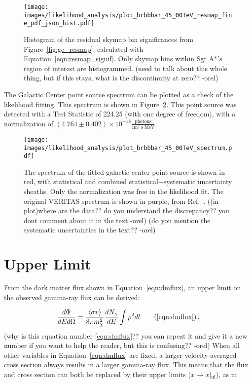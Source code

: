   \begin{figure}[ht]
    \centering
    \texttt{[image: images/likelihood\_analysis/plot\_brbbbar\_45\_00TeV\_resmap\_fine\_pdf\_json\_hist.pdf]}
    \caption[Galactic Center Residual Histogram]
    {
      Histogram of the residual skymap bin significances from Figure~\ref{fig:gc_resmap}, calculated with Equation~\ref{eqn:resmap_signif}.
      Only skymap bins within Sgr A*'s region of interest are histogrammed.
      {\color{red}(need to talk about this whole thing, but if this stays, what is the discontinuity at zero?? -orel)}
    }
    \label{fig:gc_resmap_sighist}
  \end{figure}


  The Galactic Center point source spectrum can be plotted as a check of the likelihood fitting.
  This spectrum is shown in Figure~\ref{fig:gc_pntsrc_spectrum}.
  This point source was detected with a Test Statistic of 224.25 (with one degree of freedom), with a normalization of $(4.764\pm0.402)\times 10^{-18} \frac{\textrm{photons}}{\textrm{cm}^2\;\textrm{s}\;\textrm{MeV}}$.
  

  \begin{figure}[ht]
    \centering
    \texttt{[image: images/likelihood\_analysis/plot\_brbbbar\_45\_00TeV\_spectrum.pdf]}
    \caption[Galactic Center Point Source Spectrum]
    {
      The spectrum of the fitted galactic center point source is shown in red, with statistical and combined statistical+systematic uncertainty sheaths.
      Only the normalization was free in the likelihood fit.
      The original VERITAS spectrum is shown in purple, from Ref.~\cite{VeritasGCRidge2015}.
      {\color{red}((in plot)where are the data?? do you understand the discrepancy?? you dont comment about it in the text -orel)}
      {\color{red}(do you mention the systematic uncertainties in the text?? -orel)}
    }
    \label{fig:gc_pntsrc_spectrum}
  \end{figure}
  
  
\section{Upper Limit}\label{upper_limit}
  From the dark matter flux shown in Equation~\ref{eqn:dmflux}, an upper limit on the observed gamma-ray flux can be derived:

  \begin{equation}
    \frac{ d\Phi }{ dE d \Omega } = \frac{ \left \langle \sigma v \right \rangle }{8 \pi m_\chi^2} \frac{dN_{\gamma}}{dE} \int \rho^2 dl\tag{\ref{eqn:dmflux}} \,.
  \end{equation}
  {\color{red}(why is this equation number \ref{eqn:dmflux}?? you can repeat it and give it a new number if you want to help the reader, but this is confusing?? -orel)}
  When all other variables in Equation~\ref{eqn:dmflux} are fixed, a larger velocity-averaged cross section always results in a larger gamma-ray flux.
  This means that the flux and cross section can both be replaced by their upper limits ($x \rightarrow x \left |_{\textrm{ul}}$), as in
  
